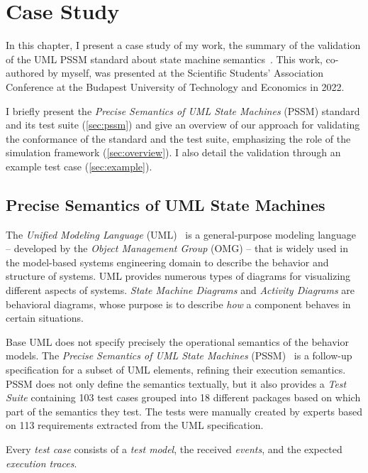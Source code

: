 \chapter{Case Study} \label{example}

In this chapter, I present a case study of my work, the summary of the validation of the UML PSSM standard about state machine semantics~\cite{tdk}. This work, co-authored by myself, was presented at the Scientific Students' Association Conference at the Budapest University of Technology and Economics in 2022.

I briefly present the \textit{Precise Semantics of UML State Machines} (PSSM) standard and its test suite (\autoref{sec:pssm}) and give an overview of our approach for validating the conformance of the standard and the test suite, emphasizing the role of the simulation framework (\autoref{sec:overview}). I also detail the validation through an example test case (\autoref{sec:example}).

\section{Precise Semantics of UML State Machines}\label{sec:pssm}

The \emph{Unified Modeling Language} (UML)~\cite{uml} is a general-purpose modeling language -- developed by the \emph{Object Management Group} (OMG) -- that is widely used in the model-based systems engineering domain to describe the behavior and structure of systems. UML provides numerous types of diagrams for visualizing different aspects of systems. \emph{State Machine Diagrams} and \emph{Activity Diagrams} are behavioral diagrams, whose purpose is to describe \emph{how} a component behaves in certain situations.

Base UML does not specify precisely the operational semantics of the behavior models. The \emph{Precise Semantics of UML State Machines} (PSSM)~\cite{pssm} is a follow-up specification for a subset of UML elements, refining their execution semantics. PSSM does not only define the semantics textually, but it also provides a \textit{Test Suite} containing 103 test cases grouped into 18 different packages based on which part of the semantics they test. The tests were manually created by experts based on 113 requirements extracted from the UML specification.

Every \textit{test case} consists of a \textit{test model}, the received \textit{events}, and the expected \textit{execution traces}.

